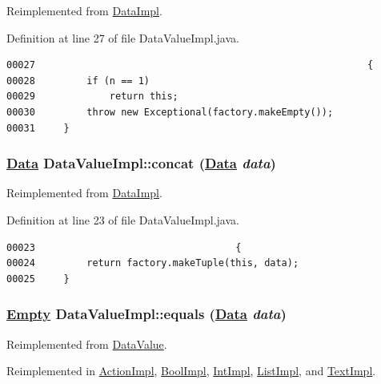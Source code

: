 Reimplemented from \hyperlink{classDataImpl_a4}{Data\-Impl}.

Definition at line 27 of file Data\-Value\-Impl.java.\footnotesize\begin{verbatim}00027                                                          {
00028         if (n == 1)
00029             return this;
00030         throw new Exceptional(factory.makeEmpty());
00031     }
\end{verbatim}\normalsize 
\hypertarget{classDataValueImpl_a3}{
\subsubsection[concat]{\setlength{\rightskip}{0pt plus 5cm}\hyperlink{interfaceData}{Data} Data\-Value\-Impl::concat (\hyperlink{interfaceData}{Data} {\em data})}}
\label{classDataValueImpl_a3}




Reimplemented from \hyperlink{classDataImpl_a0}{Data\-Impl}.

Definition at line 23 of file Data\-Value\-Impl.java.\footnotesize\begin{verbatim}00023                                   {
00024         return factory.makeTuple(this, data);
00025     }
\end{verbatim}\normalsize 
\hypertarget{classDataValueImpl_a5}{
\subsubsection[equals]{\setlength{\rightskip}{0pt plus 5cm}\hyperlink{interfaceEmpty}{Empty} Data\-Value\-Impl::equals (\hyperlink{interfaceData}{Data} {\em data})}}
\label{classDataValueImpl_a5}




Reimplemented from \hyperlink{interfaceDataValue_a0}{Data\-Value}.

Reimplemented in \hyperlink{classActionImpl_a21}{Action\-Impl}, \hyperlink{classBoolImpl_a2}{Bool\-Impl}, \hyperlink{classIntImpl_a9}{Int\-Impl}, \hyperlink{classListImpl_a5}{List\-Impl}, and \hyperlink{classTextImpl_a1}{Text\-Impl}.

